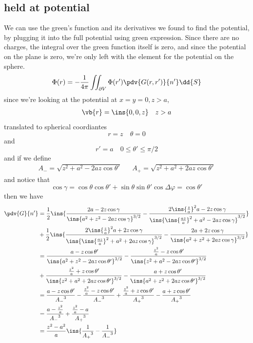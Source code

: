 \subsection{held at potential}
We can use the green's function and its derivatives we found to find the potential, by plugging it into the full potential using green expression. Since there are no charges, the integral over the green function itself is zero, and since the potential on the plane is zero, we're only left with the element for the potential on the sphere.
\begin{equation}
	\Phi(r) = -\frac{1}{4\pi} \iint_{\partial V}\Phi(r')\pdv{G(r,r')}{n'}\dd{S}
\end{equation}
since we're looking at the potential at \(x=y=0, z>a\),
\begin{align}
	\vb{r}=\ins{0,0,z} && z>a
\end{align}
translated to spherical coordiantes 
\begin{equation}
	r=z \quad \theta=0
\end{equation}
and 
\begin{equation}
	r'=a \quad 0\leq\theta'\leq\pi/2
\end{equation}
and if we define 
\begin{align}
	A_- = \sqrt{z^2+a^2-2az\cos\theta'} && A_+ = \sqrt{z^2+a^2+2az\cos\theta'}
\end{align}
and notice that 
\begin{equation}
	\cos\gamma = \cos\theta\cos\theta'+\sin\theta\sin\theta'\cos\Delta\varphi = \cos\theta'
\end{equation}
then we have 
\begin{align}
	\pdv{G}{n'} &= \frac{1}{2}\ins{\frac{2a-2z\cos\gamma}{\ins{a^2+z^2-2az\cos\gamma}^{3/2}}-\frac{2\ins{\frac{z}{a}}^2a-2z\cos\gamma}{\ins{\ins{\frac{az}{a}}^2+a^2-2az\cos\gamma}^{3/2}}}\\
	&+\frac{1}{2}\ins{\frac{2\ins{\frac{z}{a}}^2a+2z\cos\gamma}{\ins{\ins{\frac{az}{a}}^2+a^2+2az\cos\gamma}^{3/2}}-\frac{2a+2z\cos\gamma}{\ins{a^2+z^2+2az\cos\gamma}^{3/2}}}\\
	&= \frac{a-z\cos\theta'}{\ins{a^2+z^2-2az\cos\theta'}^{3/2}}-\frac{\frac{z^2}{a}-z\cos\theta'}{\ins{z^2+a^2-2az\cos\theta'}^{3/2}}\\
	&+\frac{\frac{z^2}{a}+z\cos\theta'}{\ins{z^2+a^2+2az\cos\theta'}^{3/2}}-\frac{a+z\cos\theta'}{\ins{a^2+z^2+2az\cos\theta'}^{3/2}}\\
	&= \frac{a-z\cos\theta'}{{A_-}^3}-\frac{\frac{z^2}{a}-z\cos\theta'}{{A_-}^3}+\frac{\frac{z^2}{a}+z\cos\theta'}{{A_+}^3}-\frac{a+z\cos\theta'}{{A_+}^3}\\
	&= \frac{a-\frac{z^2}{a}}{{A_-}^3}+\frac{\frac{z^2}{a}-a}{{A_+}^3}\\
	&= \frac{z^2-a^2}{a}\ins{\frac{1}{{A_+}^3}-\frac{1}{{A_-}^3}}
\end{align}
